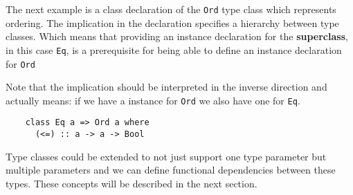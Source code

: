 The next example is a class declaration of the \texttt{Ord} type class which
represents ordering. The implication in the declaration specifies a hierarchy
between type classes. Which means that providing an instance declaration for the
\textbf{superclass}, in this case \texttt{Eq}, is a prerequisite for being
able to define an instance declaration for \texttt{Ord}

Note that the implication should be interpreted in the inverse direction and
actually means: if we have a instance for \texttt{Ord} we also have one for
\texttt{Eq}.
\begin{verbatim}
    class Eq a => Ord a where
      (<=) :: a -> a -> Bool
\end{verbatim}

Type classes could be extended to not just support one type parameter but
multiple parameters and we can define functional dependencies between these
types. These concepts will be described in the next section.
